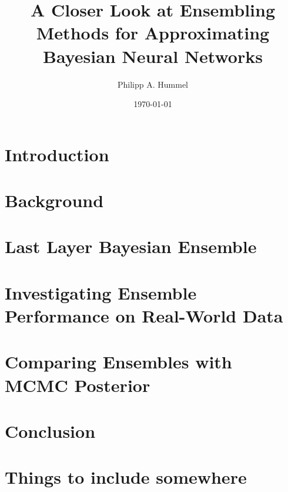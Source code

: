 \documentclass[11pt, A4, twoside]{report}
\title{A Closer Look at Ensembling Methods for Approximating Bayesian Neural Networks}
\author{Philipp A. Hummel}
\date{\today}
\begin{document}
\begin{titlepage}
\maketitle
\end{titlepage}


\begin{abstract}

\end{abstract}


\tableofcontents

\bigskip




\chapter{Introduction}

% 





\chapter{Background}

% 





\chapter{Last Layer Bayesian Ensemble}

% 






\chapter{Investigating Ensemble Performance on Real-World Data}

% 





\chapter{Comparing Ensembles with MCMC Posterior}

% 






\chapter{Conclusion}







\chapter{Things to include somewhere}


\printbibliography


\begin{appendices}

\end{appendices}
\end{document}
